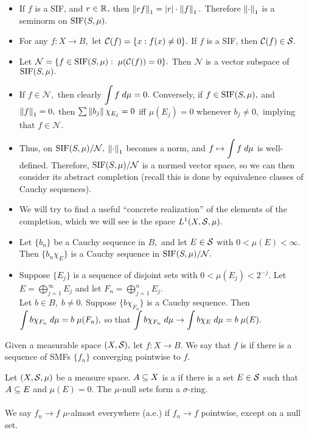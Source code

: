 \begin{itemize}
\item If $f$ is a SIF, and $r\in\mathbb{R}^{},$ then $\left\lVert rf\right\rVert_1=|r|\cdot\left\lVert f\right\rVert_1.$ Therefore $\left\lVert\cdot\right\rVert_1$ is a seminorm on $\text{SIF}(S,\mu).$ 
\item For any $f:X\rightarrow B,$ let $\mathcal{C}(f)=\{x:f(x)\neq 0\}.$ If $f$ is a SIF, then $\mathcal{C}(f)\in\mathcal{S}.$
\item Let $\mathcal{N}=\{f\in\text{SIF}(S,\mu):\;\mu(\mathcal{C}(f))=0\}.$ Then $\mathcal{N}$ is a vector subspace of $\text{SIF}(S,\mu).$
\item If $f\in\mathcal{N},$ then clearly $\displaystyle\int f\;d\mu=0.$ Conversely, if $f\in\text{SIF}(S,\mu),$ and $\left\lVert f\right\rVert_1=0,$ then $\sum\left\lVert b_j\right\rVert\chi_{E_j}=0$ iff $\mu(E_j)=0$ whenever $b_j\neq 0,$ implying that $f\in\mathcal{N}.$
\item Thus, on $\text{SIF}(S,\mu)/\mathcal{N},$ $\left\lVert\cdot\right\rVert_1$ becomes a norm, and $f\mapsto\displaystyle\int f\;d\mu$ is well-defined. Therefore, $\text{SIF}(S,\mu)/\mathcal{N}$ is a normed vector space, so we can then consider its abstract completion (recall this is done by equivalence classes of Cauchy sequences).
\item We will try to find a useful ``concrete realization'' of the elements of the completion, which we will see is the space $L^1(X,\mathcal{S},\mu).$
\item Let $\{b_n\}$ be a Cauchy sequence in $B,$ and let $E\in\mathcal{S}$ with $0<\mu(E)<\infty.$ Then $\{b_n\chi_E\}$ is a Cauchy sequence in $\text{SIF}(S,\mu)/\mathcal{N}.$
\item Suppose $\{E_j\}$ is a sequence of disjoint sets with $0<\mu(E_j)<2^{-j}.$ Let $E=\bigoplus_{j=1}^{\infty} E_j$ and let $F_n=\bigoplus_{j=1}^n E_j.$ \\
Let $b\in B,\;b\neq 0.$ Suppose $\{b\chi_{F_n}\}$ is a Cauchy sequence. Then $\displaystyle\int b\chi_{F_n}\;d\mu=b\;\mu(F_n),$ so that $\displaystyle\int b\chi_{F_n}\;d\mu\rightarrow\displaystyle\int b\chi_E\;d\mu=b\;\mu(E).$
\end{itemize}

\begin{defn}
Given a measurable space $(X,\mathcal{S}),$ let $f:X\rightarrow B.$ We say that $f$ is  if there is a sequence of SMFs $\{f_n\}$ converging pointwise to $f.$
\end{defn}

\begin{defn}
Let $(X,\mathcal{S},\mu)$ be a measure space. $A\subseteq X$ is a  if there is a set $E\in\mathcal{S}$ such that $A\subseteq E$ and $\mu(E)=0.$ The $\mu$-null sets form a $\sigma$-ring. \\ \\
We say $f_n\rightarrow f$ $\mu$-almost everywhere (a.e.) if $f_n\rightarrow f$ pointwise, except on a null set.
\end{defn}

